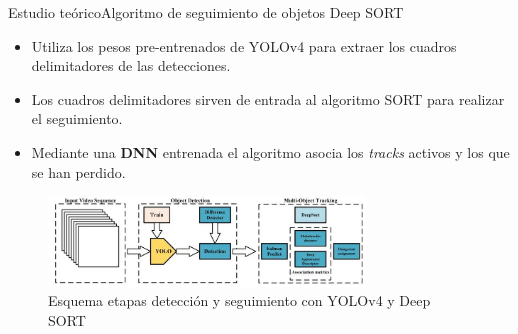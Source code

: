 \begin{frame}{Estudio teórico}{Algoritmo de seguimiento de objetos Deep SORT}

\begin{itemize}
    \justifying
    \item Utiliza los pesos pre-entrenados de YOLOv4 para extraer los cuadros delimitadores de las detecciones.
    \item Los cuadros delimitadores sirven de entrada al algoritmo SORT para realizar el seguimiento. %
    \item Mediante una \textbf{DNN} entrenada el algoritmo asocia los \textit{tracks} activos y los que se han perdido.
\end{itemize}

\begin{figure}[ht]
\centering
\includegraphics[width=0.75\textwidth]{Images/estudio-teorico/yolo-deepsort-scheme.jpg}
\caption{\label{fig:yolo-deepsort-scheme}Esquema etapas detección y seguimiento con YOLOv4 y Deep SORT}
\end{figure}

\end{frame}
